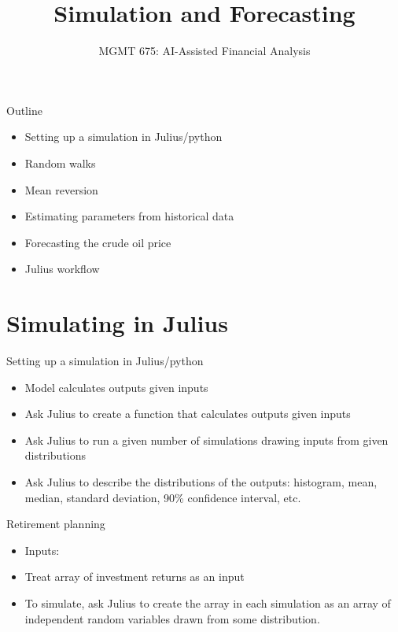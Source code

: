 \documentclass[10pt]{beamer}
\title{Simulation and Forecasting}
\subtitle{MGMT 675: AI-Assisted Financial Analysis}
\date{}
\begin{document}
\begin{frame}[plain]
\titlepage
\end{frame}

\begin{frame}{Outline}
\begin{itemize}
\item Setting up a simulation in Julius/python
\item Random walks
\item Mean reversion
\item Estimating parameters from historical data
\item Forecasting the crude oil price
\item Julius workflow
\end{itemize}
\end{frame}

\section{Simulating in Julius}

\begin{frame}{Setting up a simulation in Julius/python}
\begin{itemize}
\item Model calculates outputs given inputs
\item Ask Julius to create a function that calculates outputs given inputs
\item Ask Julius to run a given number of simulations drawing inputs from given distributions
\item Ask Julius to describe the distributions of the outputs: histogram, mean, median, standard deviation, 90\% confidence interval, etc.
\end{itemize}
\end{frame}

\begin{frame}{Retirement planning}
\begin{itemize}
\item Inputs:
\item \pause Treat array of investment returns as an input
\item \pause To simulate, ask Julius to create the array in each simulation as an array of independent random variables drawn from some distribution.
\end{itemize}
\end{frame}
\end{document}

